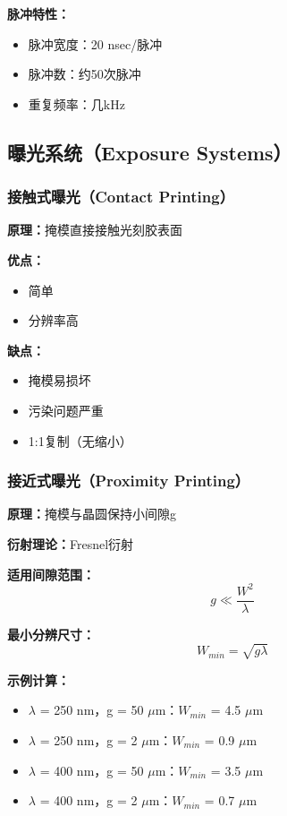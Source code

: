 \documentclass[UTF8,12pt,a4paper]{ctexart}
\begin{document}
\textbf{脉冲特性：}
\begin{itemize}
    \item 脉冲宽度：20 nsec/脉冲
    \item 脉冲数：约50次脉冲
    \item 重复频率：几kHz
\end{itemize}

\subsection{曝光系统（Exposure Systems）}

\subsubsection{接触式曝光（Contact Printing）}

\textbf{原理：}掩模直接接触光刻胶表面

\textbf{优点：}
\begin{itemize}
    \item 简单
    \item 分辨率高
\end{itemize}

\textbf{缺点：}
\begin{itemize}
    \item 掩模易损坏
    \item 污染问题严重
    \item 1:1复制（无缩小）
\end{itemize}

\subsubsection{接近式曝光（Proximity Printing）}

\textbf{原理：}掩模与晶圆保持小间隙g

\textbf{衍射理论：}Fresnel衍射

\textbf{适用间隙范围：}
\begin{equation}
g \ll \frac{W^2}{\lambda}
\end{equation}

\textbf{最小分辨尺寸：}
\begin{equation}
W_{min} = \sqrt{g\lambda}
\end{equation}

\textbf{示例计算：}
\begin{itemize}
    \item $\lambda$ = 250 nm，g = 50 $\mu$m：$W_{min}$ = 4.5 $\mu$m
    \item $\lambda$ = 250 nm，g = 2 $\mu$m：$W_{min}$ = 0.9 $\mu$m
    \item $\lambda$ = 400 nm，g = 50 $\mu$m：$W_{min}$ = 3.5 $\mu$m
    \item $\lambda$ = 400 nm，g = 2 $\mu$m：$W_{min}$ = 0.7 $\mu$m
\end{itemize}
\end{document}
